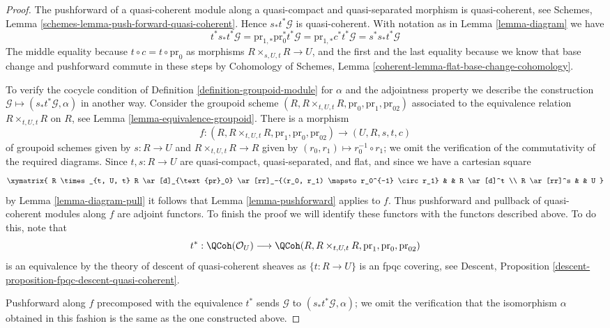 \begin{proof}
The pushforward of a quasi-coherent module along a quasi-compact and
quasi-separated morphism is quasi-coherent, see Schemes, Lemma
\ref{schemes-lemma-push-forward-quasi-coherent}. Hence $s_*t^*\mathcal{G}$
is quasi-coherent. With notation as in Lemma \ref{lemma-diagram} we have
$$
t^*s_*t^*\mathcal{G} =
\text{pr}_{1, *}\text{pr}_0^*t^*\mathcal{G} =
\text{pr}_{1, *}c^*t^*\mathcal{G} =
s^*s_*t^*\mathcal{G}
$$
The middle equality because $t \circ c = t \circ \text{pr}_0$ as
morphisms $R \times_{s, U, t} R \to U$, and the first and the last
equality because we know that base change and pushforward commute in
these steps by Cohomology of Schemes, Lemma
\ref{coherent-lemma-flat-base-change-cohomology}.

\medskip\noindent
To verify the cocycle condition of Definition \ref{definition-groupoid-module}
for $\alpha$ and the adjointness property we describe the construction
$\mathcal{G} \mapsto (s_*t^*\mathcal{G}, \alpha)$ in another way.
Consider the groupoid scheme
$(R, R \times_{t, U, t} R, \text{pr}_0, \text{pr}_1, \text{pr}_{02})$
associated to the equivalence relation $R \times_{t, U, t} R$
on $R$, see Lemma \ref{lemma-equivalence-groupoid}.
There is a morphism
$$
f :
(R, R \times_{t, U, t} R, \text{pr}_1, \text{pr}_0, \text{pr}_{02})
\longrightarrow
(U, R, s, t, c)
$$
of groupoid schemes given by $s : R \to U$ and $R \times_{t, U, t} R \to R$
given by $(r_0, r_1) \mapsto r_0^{-1} \circ r_1$; we omit the verification
of the commutativity of the required diagrams. Since
$t, s : R \to U$ are quasi-compact, quasi-separated, and flat,
and since we have a cartesian square
$$
\xymatrix{
R \times_{t, U, t} R \ar[d]_{\text{pr}_0}
\ar[rr]_-{(r_0, r_1) \mapsto r_0^{-1} \circ r_1} & & R \ar[d]^t \\
R \ar[rr]^s & & U
}
$$
by Lemma \ref{lemma-diagram-pull} it follows that
Lemma \ref{lemma-pushforward} applies to $f$.
Thus pushforward and pullback of quasi-coherent modules along
$f$ are adjoint functors. To finish the proof we will identify these functors
with the functors described above. To do this, note that
$$
t^* :
\QCoh(\mathcal{O}_U)
\longrightarrow
\QCoh(R, R \times_{t, U, t} R, \text{pr}_1, \text{pr}_0, \text{pr}_{02})
$$
is an equivalence by the theory of descent of quasi-coherent sheaves as
$\{t : R \to U\}$ is an fpqc covering, see
Descent, Proposition \ref{descent-proposition-fpqc-descent-quasi-coherent}.

\medskip\noindent
Pushforward along $f$ precomposed with the equivalence $t^*$ sends
$\mathcal{G}$ to $(s_*t^*\mathcal{G}, \alpha)$;
we omit the verification that the isomorphism $\alpha$
obtained in this fashion is the same as the one constructed above.


\end{proof}
